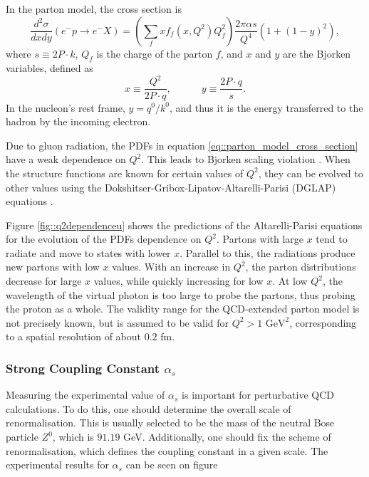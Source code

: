     In the parton model, the cross section is
    \begin{equation}
        \label{eq::parton_model_cross_section}
        \frac{d^2\sigma}{dxdy} \left( e^-p \rightarrow e^-X \right) =
                \left( \sum_f xf_f \left( x, Q^2 \right) Q_f^2 \right)
                \frac{2\pi\alpha s}{Q^4} \left( 1 + \left( 1 - y \right)^2 \right),
    \end{equation}
    where $s \equiv 2P\cdot k$, $Q_f$ is the charge of the parton $f$, and $x$ and $y$ are the Bjorken variables, defined as
    \begin{equation*}
        x \equiv \frac{Q^2}{2P\cdot q}, \hspace{36pt} y \equiv \frac{2 P\cdot q}{s}.
    \end{equation*}
    In the nucleon's rest frame, $y = q^0/k^0$, and thus it is the energy transferred to the hadron by the incoming electron.

    Due to gluon radiation, the PDFs in equation \eqref{eq::parton_model_cross_section} have a weak dependence on $Q^2$.
    This leads to Bjorken scaling violation \cite{halzen1991}.
    When the structure functions are known for certain values of $Q^2$, they can be evolved to other values using the Dokshitser-Gribox-Lipatov-Altarelli-Parisi (DGLAP) equations \cite{dokshitzer1991}.

    Figure \ref{fig::q2dependenceu} shows the predictions of the Altarelli-Parisi equations for the evolution of the PDFs dependence on $Q^2$.
    Partons with large $x$ tend to radiate and move to states with lower $x$.
    Parallel to this, the radiations produce new partons with low $x$ values.
    With an increase in $Q^2$, the parton distributions decrease for large $x$ values, while quickly increasing for low $x$.
    At low $Q^2$, the wavelength of the virtual photon is too large to probe the partons, thus probing the proton as a whole.
    The validity range for the QCD-extended parton model is not precisely known, but is assumed to be valid for $Q^2 > 1 \text{ GeV}^2$, corresponding to a spatial resolution of about $0.2$ fm.

    \subsubsection{Strong Coupling Constant $\alpha_s$}
        Measuring the experimental value of $\alpha_s$ is important for perturbative QCD calculations.
        To do this, one should determine the overall scale of renormalisation.
        This is usually selected to be the mass of the neutral Bose particle $Z^0$, which is $91.19$ GeV.
        Additionally, one should fix the scheme of renormalisation, which defines the coupling constant in a given scale.
        The experimental results for $\alpha_s$ can be seen on figure

